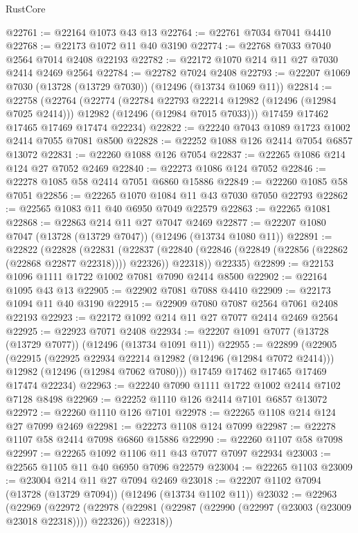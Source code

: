 \begin{lexlean}{RustCore}
\begin{coremodule}
@22761 := @22164 @1073 @43 @13
@22764 := @22761 @7034 @7041 @4410
@22768 := @22173 @1072 @11 @40 @3190
@22774 := @22768 @7033 @7040 @2564 @7014 @2408 @22193
@22782 := @22172 @1070 @214 @11 @27 @7030 @2414 @2469 @2564
@22784 := @22782 @7024 @2408
@22793 := @22207 @1069 @7030 (@13728 (@13729 @7030)) (@12496 (@13734 @1069 @11))
@22814 := @22758
    (@22764
      (@22774
        (@22784 @22793 @22214 @12982 (@12496 (@12984 @7025 @2414)))
        @12982
        (@12496 (@12984 @7015 @7033)))
      @17459
      @17462
      @17465
      @17469
      @17474
      @22234)
@22822 := @22240 @7043 @1089 @1723 @1002 @2414 @7055 @7081 @8500
@22828 := @22252 @1088 @126 @2414 @7054 @6857 @13072
@22831 := @22260 @1088 @126 @7054
@22837 := @22265 @1086 @214 @124 @27 @7052 @2469
@22840 := @22273 @1086 @124 @7052
@22846 := @22278 @1085 @58 @2414 @7051 @6860 @15886
@22849 := @22260 @1085 @58 @7051
@22856 := @22265 @1070 @1084 @11 @43 @7030 @7050 @22793
@22862 := @22565 @1083 @11 @40 @6950 @7049 @22579
@22863 := @22265 @1081
@22868 := @22863 @214 @11 @27 @7047 @2469
@22877 := @22207 @1080 @7047 (@13728 (@13729 @7047)) (@12496 (@13734 @1080 @11))
@22891 := @22822
    (@22828
      (@22831
        (@22837 (@22840 (@22846 (@22849 (@22856 (@22862 (@22868 @22877 @22318)))) @22326)) @22318))
      @22335)
@22899 := @22153 @1096 @1111 @1722 @1002 @7081 @7090 @2414 @8500
@22902 := @22164 @1095 @43 @13
@22905 := @22902 @7081 @7088 @4410
@22909 := @22173 @1094 @11 @40 @3190
@22915 := @22909 @7080 @7087 @2564 @7061 @2408 @22193
@22923 := @22172 @1092 @214 @11 @27 @7077 @2414 @2469 @2564
@22925 := @22923 @7071 @2408
@22934 := @22207 @1091 @7077 (@13728 (@13729 @7077)) (@12496 (@13734 @1091 @11))
@22955 := @22899
    (@22905
      (@22915
        (@22925 @22934 @22214 @12982 (@12496 (@12984 @7072 @2414)))
        @12982
        (@12496 (@12984 @7062 @7080)))
      @17459
      @17462
      @17465
      @17469
      @17474
      @22234)
@22963 := @22240 @7090 @1111 @1722 @1002 @2414 @7102 @7128 @8498
@22969 := @22252 @1110 @126 @2414 @7101 @6857 @13072
@22972 := @22260 @1110 @126 @7101
@22978 := @22265 @1108 @214 @124 @27 @7099 @2469
@22981 := @22273 @1108 @124 @7099
@22987 := @22278 @1107 @58 @2414 @7098 @6860 @15886
@22990 := @22260 @1107 @58 @7098
@22997 := @22265 @1092 @1106 @11 @43 @7077 @7097 @22934
@23003 := @22565 @1105 @11 @40 @6950 @7096 @22579
@23004 := @22265 @1103
@23009 := @23004 @214 @11 @27 @7094 @2469
@23018 := @22207 @1102 @7094 (@13728 (@13729 @7094)) (@12496 (@13734 @1102 @11))
@23032 := @22963
    (@22969
      (@22972
        (@22978 (@22981 (@22987 (@22990 (@22997 (@23003 (@23009 @23018 @22318)))) @22326)) @22318))

\end{coremodule}
\end{lexlean}
